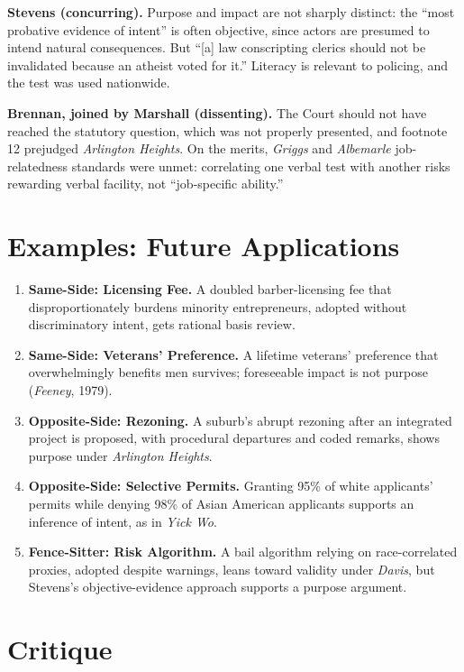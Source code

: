 \documentclass[12pt]{article}
\begin{document}
\textbf{Stevens (concurring).} Purpose and impact are not sharply distinct: the ``most probative evidence of intent'' is often objective, since actors are presumed to intend natural consequences. But ``[a] law conscripting clerics should not be invalidated because an atheist voted for it.'' Literacy is relevant to policing, and the test was used nationwide.

\textbf{Brennan, joined by Marshall (dissenting).} The Court should not have reached the statutory question, which was not properly presented, and footnote 12 prejudged \textit{Arlington Heights}. On the merits, \textit{Griggs} and \textit{Albemarle} job-relatedness standards were unmet: correlating one verbal test with another risks rewarding verbal facility, not ``job-specific ability.''

\section{Examples: Future Applications}

\begin{enumerate}
\item \textbf{Same-Side: Licensing Fee.} A doubled barber-licensing fee that disproportionately burdens minority entrepreneurs, adopted without discriminatory intent, gets rational basis review.
\item \textbf{Same-Side: Veterans' Preference.} A lifetime veterans' preference that overwhelmingly benefits men survives; foreseeable impact is not purpose (\textit{Feeney}, 1979).
\item \textbf{Opposite-Side: Rezoning.} A suburb's abrupt rezoning after an integrated project is proposed, with procedural departures and coded remarks, shows purpose under \textit{Arlington Heights}.
\item \textbf{Opposite-Side: Selective Permits.} Granting 95\% of white applicants' permits while denying 98\% of Asian American applicants supports an inference of intent, as in \textit{Yick Wo}.
\item \textbf{Fence-Sitter: Risk Algorithm.} A bail algorithm relying on race-correlated proxies, adopted despite warnings, leans toward validity under \textit{Davis}, but Stevens's objective-evidence approach supports a purpose argument.
\end{enumerate}

\section{Critique}
\end{document}
